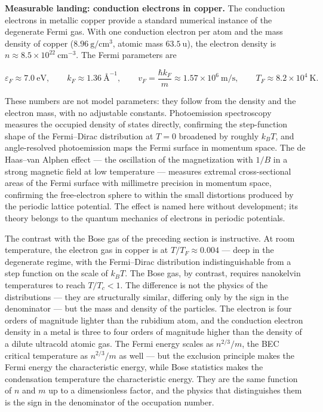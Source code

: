 \medskip\noindent\textbf{Measurable landing: conduction electrons in copper.}
The conduction electrons in metallic copper provide a standard numerical instance of the degenerate Fermi gas. With one conduction electron per atom and the mass density of copper ($8.96\ \text{g}/\text{cm}^3$, atomic mass $63.5\ \text{u}$), the electron density is $n \approx 8.5 \times 10^{22}\ \text{cm}^{-3}$. The Fermi parameters are
\begin{linenomath}
    \begin{equation}
        \varepsilon_F \approx 7.0\ \text{eV},
        \qquad
        k_F \approx 1.36\ \text{\AA}^{-1},
        \qquad
        v_F = \frac{\hbar k_F}{m} \approx 1.57 \times 10^6\ \text{m}/\text{s},
        \qquad
        T_F \approx 8.2 \times 10^4\ \text{K}.
        \label{eq:copper-fermi-energy}
    \end{equation}
\end{linenomath}
These numbers are not model parameters: they follow from the density and the electron mass, with no adjustable constants. Photoemission spectroscopy measures the occupied density of states directly, confirming the step-function shape of the Fermi--Dirac distribution at $T=0$ broadened by roughly $k_B T$, and angle-resolved photoemission maps the Fermi surface in momentum space. The de Haas--van Alphen effect --- the oscillation of the magnetization with $1/B$ in a strong magnetic field at low temperature --- measures extremal cross-sectional areas of the Fermi surface with millimetre precision in momentum space, confirming the free-electron sphere to within the small distortions produced by the periodic lattice potential. The effect is named here without development; its theory belongs to the quantum mechanics of electrons in periodic potentials.

The contrast with the Bose gas of the preceding section is instructive. At room temperature, the electron gas in copper is at $T/T_F \approx 0.004$ --- deep in the degenerate regime, with the Fermi--Dirac distribution indistinguishable from a step function on the scale of $k_B T$. The Bose gas, by contrast, requires nanokelvin temperatures to reach $T/T_c < 1$. The difference is not the physics of the distributions --- they are structurally similar, differing only by the sign in the denominator --- but the mass and density of the particles. The electron is four orders of magnitude lighter than the rubidium atom, and the conduction electron density in a metal is three to four orders of magnitude higher than the density of a dilute ultracold atomic gas. The Fermi energy scales as $n^{2/3}/m$, the BEC critical temperature as $n^{2/3}/m$ as well --- but the exclusion principle makes the Fermi energy the characteristic energy, while Bose statistics makes the condensation temperature the characteristic energy. They are the same function of $n$ and $m$ up to a dimensionless factor, and the physics that distinguishes them is the sign in the denominator of the occupation number.

